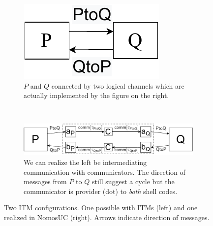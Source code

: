 \begin{figure}
	\begin{subfigure}{0.5\textwidth}
	\centering
	\includegraphics[scale=0.5]{figures/p_and_q.pdf}
	\caption{$P$ and $Q$ connected by two logical channels which are actually implemented by the figure on the right.}
	\label{fig:pandq}
	\end{subfigure}
	\\
	\begin{subfigure}{0.5\textwidth}
	\centering
	\includegraphics[scale=0.5]{figures/newPandQ.pdf}
	\caption{We can realize the left be intermediating communication with communicators. The direction of messages from $P$ to $Q$ still suggest a cycle but the communicator is provider (dot) to \emph{both} shell codes.}
	\label{fig:newpandq}
	\end{subfigure}
	\caption{Two ITM configurations. One possible with ITMs (left) and one realized in NomosUC (right). Arrows indicate direction of messages.}
	\vspace{-5mm}
\end{figure}

